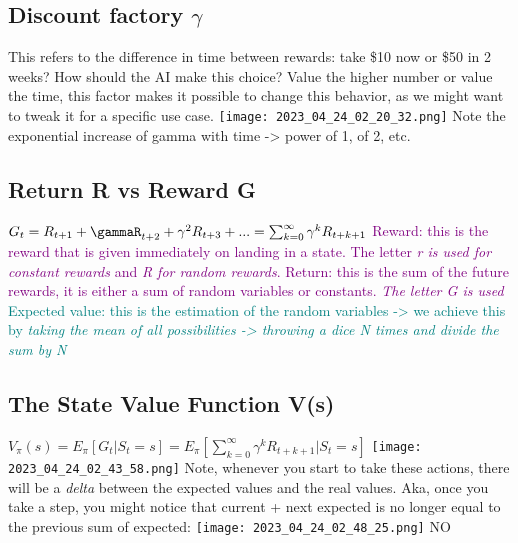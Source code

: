 \documentclass[main.tex,fontsize=8pt,paper=a4,paper=portrait,DIV=calc,]{scrartcl}
\begin{document}
\subsection{Discount factory \(\gamma\)}
This refers to the difference in time between rewards: take \$10 now or \$50 in 2 weeks?\newline
How should the AI make this choice? Value the higher number or value the time, this factor makes it possible to change this behavior, as we might want to tweak it for a specific use case.\newline
\texttt{[image: 2023\_04\_24\_02\_20\_32.png]}\newline
Note the exponential increase of gamma with time -> power of 1, of 2, etc.

\subsection{Return R vs Reward G}
\large \(G_t = R_{t+1} + \gammaR_{t+2} +\gamma^2R_{t+3} + ... = \sum^{\infty}_{k=0}\gamma^kR_{t+k+1}\)\newline
\normalsize
\textcolor{purple}{Reward: this is the reward that is given immediately on landing in a state. The letter \emph{r is used for constant rewards} and \emph{R for random rewards}.}\newlinw
\textcolor{purple}{Return: this is the sum of the future rewards, it is either a sum of random variables or constants. \emph{The letter G is used}}\newline
\textcolor{teal}{Expected value: this is the estimation of the random variables -> we achieve this by \emph{taking the mean of all possibilities -> throwing a dice N times and divide the sum by N}}

\subsection{The State Value Function V(s)}
\large \(V_{\pi}(s) = E_{\pi}[G_t | S_t = s ] = E_{\pi} \left[\sum^{\infty}_{k=0}\gamma^kR_{t+k+1} | S_t = s \right]\)\newline
\normalsize
\texttt{[image: 2023\_04\_24\_02\_43\_58.png]}\newline
Note, whenever you start to take these actions, there will be a \emph{delta} between the expected values and the real values.\newline
Aka, once you take a step, you might notice that current + next expected is no longer equal to the previous sum of expected:\newline
\texttt{[image: 2023\_04\_24\_02\_48\_25.png]}\newline
NO
\end{document}
